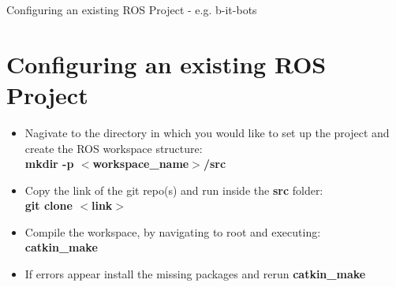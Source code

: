 \documentclass[11pt]{beamer}
\begin{document}
	\begin{frame}{Configuring an existing ROS Project - e.g. b-it-bots}
		\section{Configuring an existing ROS Project}
		\begin{itemize}
			\item{Nagivate to the directory in which you would like to set up the project and create the ROS workspace structure:\\ \textbf{mkdir -p $<$workspace\_name$>$/src}}
			\item{Copy the link of the git repo(s) and run inside the \textbf{src} folder:\\ \textbf{git clone $<$link$>$}}
			\item{Compile the workspace, by navigating to root and executing:\\ \textbf{catkin\_make}}
			\item{If errors appear install the missing packages and rerun \textbf{catkin\_make}}
		\end{itemize}
	\end{frame}
\end{document}
